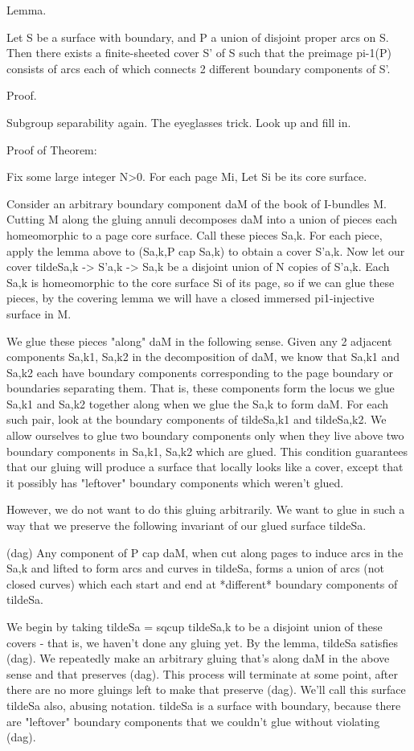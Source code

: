 \documentclass[12pt]{amsart}
\theoremstyle{definition}
\theoremstyle{remark}
\begin{document}
Lemma.

Let S be a surface with boundary, and P a union of disjoint proper arcs on S.
Then there exists a finite-sheeted cover S' of S such that the preimage pi-1(P)
consists of arcs each of which connects 2 different boundary components of S'.

Proof.

Subgroup separability again. The eyeglasses trick. Look up and fill in.

Proof of Theorem:

Fix some large integer N>0. For each page Mi, Let Si be its core surface.

Consider an arbitrary boundary component daM of the book of I-bundles M.
Cutting M along the gluing annuli decomposes daM into a union of pieces each
homeomorphic to a page core surface. Call these pieces Sa,k. For each piece,
apply the lemma above to (Sa,k,P cap Sa,k) to obtain a cover S'a,k. Now let our
cover tildeSa,k -> S'a,k -> Sa,k be a disjoint union of N copies of S'a,k. Each
Sa,k is homeomorphic to the core surface Si of its page, so if we can glue
these pieces, by the covering lemma we will have a closed immersed
pi1-injective surface in M.

We glue these pieces "along" daM in the following sense. Given any 2 adjacent
components Sa,k1, Sa,k2 in the decomposition of daM, we know that Sa,k1 and
Sa,k2 each have boundary components corresponding to the page boundary or
boundaries separating them. That is, these components form the locus we glue
Sa,k1 and Sa,k2 together along when we glue the Sa,k to form daM. For each such
pair, look at the boundary components of tildeSa,k1 and tildeSa,k2. We allow
ourselves to glue two boundary components only when they live above two
boundary components in Sa,k1, Sa,k2 which are glued. This condition guarantees
that our gluing will produce a surface that locally looks like a cover, except
that it possibly has "leftover" boundary components which weren't glued.

However, we do not want to do this gluing arbitrarily. We want to glue in such
a way that we preserve the following invariant of our glued surface tildeSa.

(dag) Any component of P cap daM, when cut along pages to induce arcs in the
Sa,k and lifted to form arcs and curves in tildeSa, forms a union of arcs (not
closed curves) which each start and end at *different* boundary components of
tildeSa.

We begin by taking tildeSa = sqcup tildeSa,k to be a disjoint union of these
covers - that is, we haven't done any gluing yet. By the lemma, tildeSa
satisfies (dag). We repeatedly make an arbitrary gluing that's along daM in the
above sense and that preserves (dag).  This process will terminate at some
point, after there are no more gluings left to make that preserve (dag). We'll
call this surface tildeSa also, abusing notation. tildeSa is a surface with
boundary, because there are "leftover" boundary components that we couldn't
glue without violating (dag).
\end{document}
